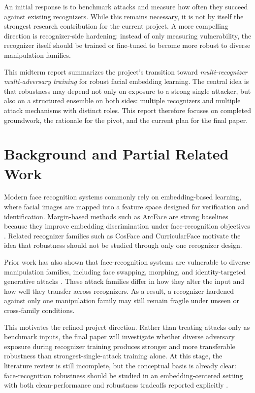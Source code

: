 \documentclass[conference]{IEEEtran}
\begin{document}
An initial response is to benchmark attacks and measure how often they succeed
against existing recognizers. While this remains necessary, it is not by itself
the strongest research contribution for the current project. A more compelling
direction is recognizer-side hardening: instead of only measuring
vulnerability, the recognizer itself should be trained or fine-tuned to become
more robust to diverse manipulation families.

This midterm report summarizes the project's transition toward
\emph{multi-recognizer multi-adversary training} for robust facial embedding
learning. The central idea is that robustness may depend not only on exposure
to a strong single attacker, but also on a structured ensemble on both sides:
multiple recognizers and multiple attack mechanisms with distinct roles. This
report therefore focuses on completed groundwork, the rationale for the pivot,
and the current plan for the final paper.

\section{Background and Partial Related Work}
Modern face recognition systems commonly rely on embedding-based learning,
where facial images are mapped into a feature space designed for verification
and identification. Margin-based methods such as ArcFace are strong baselines
because they improve embedding discrimination under face-recognition objectives
\cite{arcface}. Related recognizer families such as CosFace and CurricularFace
motivate the idea that robustness should not be studied through only one
recognizer design.

Prior work has also shown that face-recognition systems are vulnerable to
diverse manipulation families, including face swapping, morphing, and
identity-targeted generative attacks \cite{simswap,advfacegan,mordiff}. These
attack families differ in how they alter the input and how well they transfer
across recognizers. As a result, a recognizer hardened against only one
manipulation family may still remain fragile under unseen or cross-family
conditions.

This motivates the refined project direction. Rather than treating attacks only
as benchmark inputs, the final paper will investigate whether diverse adversary
exposure during recognizer training produces stronger and more transferable
robustness than strongest-single-attack training alone. At this stage,
the literature review is still incomplete, but the conceptual basis is already
clear: face-recognition robustness should be studied in an embedding-centered
setting with both clean-performance and robustness tradeoffs reported
explicitly \cite{altuncu2025}.
\end{document}

